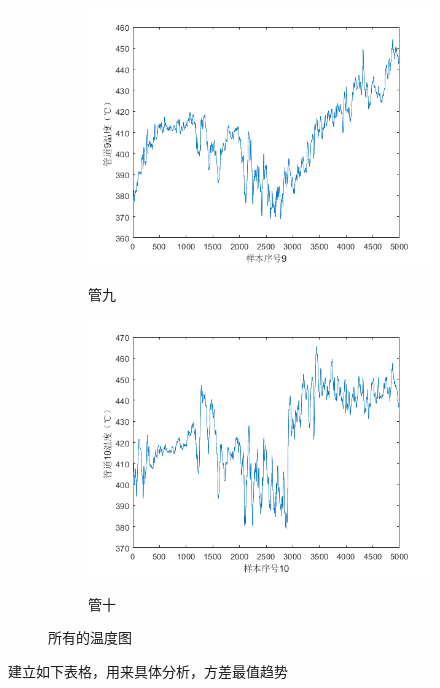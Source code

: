 \begin{figure}[h]
            \begin{subfigure}{0.24\textwidth}
                \includegraphics[width=\textwidth]{figures/p1_9.png}
                \label{p1_9}
                \caption{管九}
            \end{subfigure}
            \begin{subfigure}{0.24\textwidth}
                \includegraphics[width=\textwidth]{figures/p1_10.png}
                \label{p1_10}
                \caption{管十}
            \end{subfigure}
            \caption{所有的温度图}
        \end{figure}
        建立如下表格，用来具体分析，方差最值趋势
